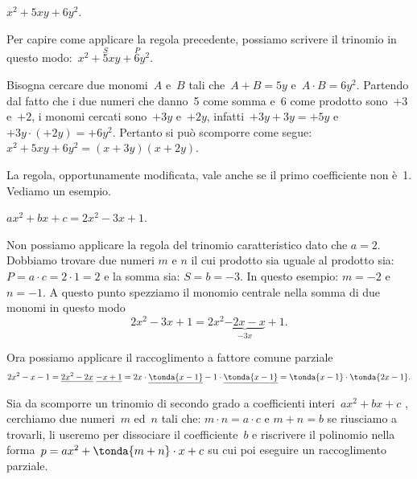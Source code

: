  \begin{esempio}
 \(x^2+5xy+6y^{2}\).

 Per capire come applicare la regola precedente, possiamo scrivere il
trinomio in questo modo:~\(x^2+\overset{S}{5}xy+\overset{P}{6}y{^{2}}\).

Bisogna cercare due monomi~\(A\) e~\(B\) tali che~\(A+B=5y\)
e~\(A\cdot B=6y^{2}\). Partendo dal fatto che i due numeri che danno~5
come somma e~6 come prodotto sono~\(+3\) e~\(+2\), i monomi cercati 
sono~\(+3y\) e~\(+2y\), infatti~\(+3y+3y=+5y\) e~\(+3y\cdot (+2y)=+6y^{2}\). 
Pertanto si può scomporre come segue:~\(x^2+5xy+6y^{2}=(x+3y)(x+2y)\).
 \end{esempio}

La regola, opportunamente modificata, vale anche se il primo
coefficiente non è~1. Vediamo un esempio.

 \begin{esempio}
 \(ax^2+bx+c=2x^2-3x+1\).

Non possiamo applicare la regola del trinomio caratteristico dato che 
\(a=2\).
Dobbiamo trovare due numeri \(m\) e \(n\) il cui prodotto sia uguale al 
prodotto sia: \(P = a \cdot c = 2 \cdot 1 = 2\)
e la somma sia: \(S = b = -3\).
In questo esempio: \(m = -2\) e \(n = -1\).
A questo punto spezziamo il monomio centrale nella somma di due monomi in 
questo modo
\[2x^2-3x+1=2x^2\underbrace{-2x-x}_{-3x}+1.\]

Ora possiamo applicare il raccoglimento a fattore comune parziale
\[2x^2-x-1=
\underline{2x^2-2x}~\underline{-x+1}=
2x \cdot \underline{\tonda{x-1}}-1 \cdot \underline{\tonda{x-1}}=
\tonda{x-1}\cdot \tonda{2x-1}.\]
 \end{esempio}

\begin{procedura}
Sia da scomporre un trinomio di secondo grado a coefficienti 
interi~\(ax^2+bx+c\)
, cerchiamo due numeri~\(m\) ed~\(n\) tali che: \quad 
\(m \cdot n = a \cdot c\) \quad 
e \quad 
\(m+n=b\)  \quad
se riusciamo a trovarli, li useremo per dissociare
il coefficiente~\(b\) e riscrivere il polinomio nella 
forma~\(p=ax^2+\tonda{m+n}\cdot x+c\)
su cui poi eseguire un raccoglimento parziale.
\end{procedura}

